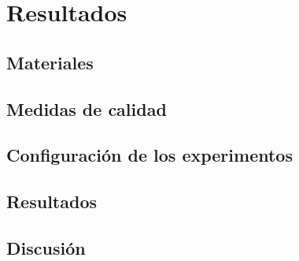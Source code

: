 
\chapter{Resultados} %

\label{ChapterX} %


\section{Materiales}

\section{Medidas de calidad}

\section{Configuraci\'on de los experimentos}

\section{Resultados}

\section{Discusi\'on}